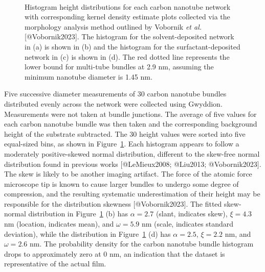 \documentclass[
  letterpaper,
  DIV=11,
  numbers=noendperiod]{scrartcl}
\begin{document}
\begin{figure}
\begin{minipage}[t]{0.45\linewidth}
\end{minipage}%
%
\begin{minipage}[t]{0.01\linewidth}

{\centering 

~

}

\end{minipage}%

\caption{\label{fig-cnt-histogram}Histogram height distributions for
each carbon nanotube network with corresponding kernel density estimate
plots collected via the morphology analysis method outlined by Vobornik
\emph{et al.} {[}@Vobornik2023{]}. The histogram for the
solvent-deposited network in (a) is shown in (b) and the histogram for
the surfactant-deposited network in (c) is shown in (d). The red dotted
line represents the lower bound for multi-tube bundles at 2.9 nm,
assuming the minimum nanotube diameter is 1.45 nm.}

\end{figure}

Five successive diameter measurements of 30 carbon nanotube bundles
distributed evenly across the network were collected using Gwyddion.
Measurements were not taken at bundle junctions. The average of five
values for each carbon nanotube bundle was then taken and the
corresponding background height of the substrate subtracted. The 30
height values were sorted into five equal-sized bins, as shown in
Figure~\ref{fig-cnt-histogram}. Each histogram appears to follow a
moderately positive-skewed normal distribution, different to the
skew-free normal distribution found in previous works {[}@LeMieux2008;
@Liu2013; @Vobornik2023{]}. The skew is likely to be another imaging
artifact. The force of the atomic force microscope tip is known to cause
larger bundles to undergo some degree of compression, and the resulting
systematic underestimation of their height may be responsible for the
distribution skewness {[}@Vobornik2023{]}. The fitted skew-normal
distribution in Figure~\ref{fig-cnt-histogram} (b) has \(\alpha = 2.7\)
(slant, indicates skew), \(\xi = 4.3\) nm (location, indicates mean),
and \(\omega = 5.9\) nm (scale, indicates standard deviation), while the
distribution in Figure~\ref{fig-cnt-histogram} (d) has \(\alpha = 2.5\),
\(\xi = 2.2\) nm, and \(\omega = 2.6\) nm. The probability density for
the carbon nanotube bundle histogram drops to approximately zero at 0
nm, an indication that the dataset is representative of the actual film.
\end{document}
